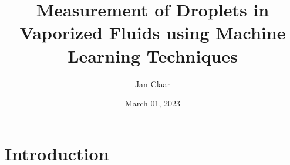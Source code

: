 \documentclass[
    headings=optiontohead,              %
    12pt,                               %
    DIV=13,                             %
    twoside=false,                      %
    open=right,                         %
    BCOR=00mm,                          %
    toc=bibliographynumbered,            %
    parskip=half,                       %
]{scrarticle}
\title{Measurement of Droplets in Vaporized Fluids using Machine Learning Techniques}
\author{Jan Claar}
\date{March 01, 2023}
\begin{document}
    \tableofcontents
    \section{Introduction} %
    \label{sec:Introduction}
    
\end{document}
